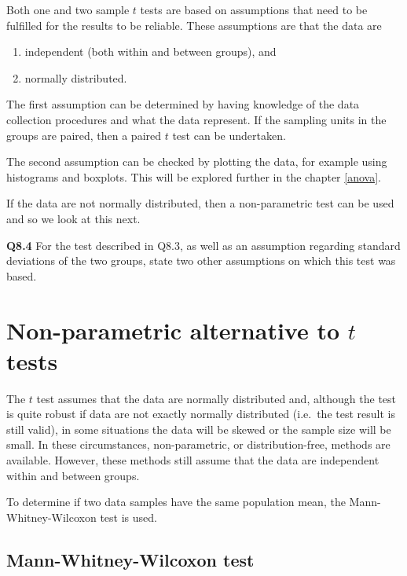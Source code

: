 \documentclass[
  oneside]{krantz}
\begin{document}
Both one and two sample \(t\) tests are based on assumptions that need to be fulfilled for the results to be reliable. These assumptions are that the data are

\begin{enumerate}
\def\labelenumi{\arabic{enumi}.}
\item
  independent (both within and between groups), and
\item
  normally distributed.
\end{enumerate}

The first assumption can be determined by having knowledge of the data collection procedures and what the data represent. If the sampling units in the groups are paired, then a paired \(t\) test can be undertaken.

The second assumption can be checked by plotting the data, for example using histograms and boxplots. This will be explored further in the chapter \ref{anova}.

If the data are not normally distributed, then a non-parametric test can be used and so we look at this next.

\textbf{Q8.4} For the test described in Q8.3, as well as an assumption regarding standard deviations of the two groups, state two other assumptions on which this test was based.

\hypertarget{non-parametric-alternative-to-t-tests}{%
\section{\texorpdfstring{Non-parametric alternative to \(t\) tests}{Non-parametric alternative to t tests}}\label{non-parametric-alternative-to-t-tests}}

The \(t\) test assumes that the data are normally distributed and, although the test is quite robust if data are not exactly normally distributed (i.e.~the test result is still valid), in some situations the data will be skewed or the sample size will be small. In these circumstances, non-parametric, or distribution-free, methods are available. However, these methods still assume that the data are independent within and between groups.

To determine if two data samples have the same population mean, the Mann-Whitney-Wilcoxon test is used.

\hypertarget{mann-whitney-wilcoxon-test}{%
\subsection{Mann-Whitney-Wilcoxon test}\label{mann-whitney-wilcoxon-test}}
\end{document}
